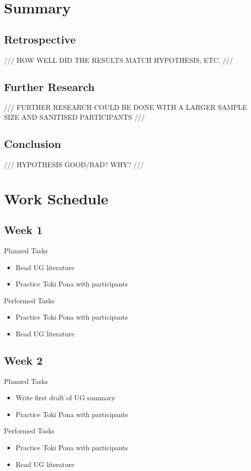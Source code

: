 \documentclass[a4paper,10pt]{article}
\begin{document}
\section{Summary}
\subsection{Retrospective}
/// HOW WELL DID THE RESULTS MATCH HYPOTHESIS, ETC. ///

\subsection{Further Research}
/// FURTHER RESEARCH COULD BE DONE WITH A LARGER SAMPLE SIZE AND SANITISED PARTICIPANTS ///

\subsection{Conclusion}
/// HYPOTHESIS GOOD/BAD? WHY? ///


\section{Work Schedule}
\subsection{Week 1}
\large{Planned Tasks}
\begin{itemize}
	\item Read UG literature
	\item Practice Toki Pona with participants
\end{itemize}
\large{Performed Tasks}
\begin{itemize}
	\item Practice Toki Pona with participants
	\item Read UG literature
\end{itemize}
\subsection{Week 2}
\large{Planned Tasks}
\begin{itemize}
	\item Write first draft of UG summary
	\item Practice Toki Pona with participants
\end{itemize}
\large{Performed Tasks}
\begin{itemize}
	\item Practice Toki Pona with participants
	\item Read UG literature
\end{itemize}
\end{document}
